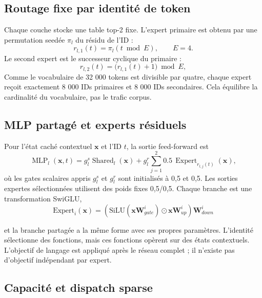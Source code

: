 \documentclass[10pt]{article}
\theoremstyle{definition}
\theoremstyle{remark}
\begin{document}
\subsection{Routage fixe par identit\'{e} de token}
\label{sec:token_routed_mlp}

Chaque couche stocke une table top-2 fixe. L'expert primaire est obtenu par une permutation seed\'{e}e $\pi_l$ du r\'{e}sidu de l'ID :
\begin{equation}
r_{l,1}(t)=\pi_l(t \bmod E), \qquad E=4.
\label{eq:routing}
\end{equation}
Le second expert est le successeur cyclique du primaire :
\begin{equation}
r_{l,2}(t)=\bigl(r_{l,1}(t)+1\bigr)\bmod E,
\label{eq:secondary_routing}
\end{equation}
Comme le vocabulaire de 32 000 tokens est divisible par quatre, chaque expert re\c{c}oit exactement 8 000 IDs primaires et 8 000 IDs secondaires. Cela \'{e}quilibre la cardinalit\'{e} du vocabulaire, pas le trafic corpus.

\subsection{MLP partag\'{e} et experts r\'{e}siduels}

Pour l'\'{e}tat cach\'{e} contextuel $\mathbf{x}$ et l'ID $t$, la sortie feed-forward est
\begin{equation}
\operatorname{MLP}_l(\mathbf{x},t)=g^s_l\operatorname{Shared}_l(\mathbf{x})+g^r_l\!\sum_{j=1}^{2}0.5\,\operatorname{Expert}_{r_{l,j}(t)}(\mathbf{x}),
\label{eq:mlp_routed}
\end{equation}
o\`{u} les gates scalaires appris $g^s_l$ et $g^r_l$ sont initialis\'{e}s \`{a} 0,5 et 0,5. Les sorties expertes s\'{e}lectionn\'{e}es utilisent des poids fixes 0,5/0,5. Chaque branche est une transformation SwiGLU,
\begin{equation}
\text{Expert}_i(\mathbf{x}) = (\text{SiLU}(\mathbf{x}\mathbf{W}^i_{gate}) \odot \mathbf{x}\mathbf{W}^i_{up})\mathbf{W}^i_{down}
\label{eq:expert}
\end{equation}

et la branche partag\'{e}e a la m\^{e}me forme avec ses propres param\`{e}tres. L'identit\'{e} s\'{e}lectionne des fonctions, mais ces fonctions op\`{e}rent sur des \'{e}tats contextuels. L'objectif de langage est appliqu\'{e} apr\`{e}s le r\'{e}seau complet ; il n'existe pas d'objectif ind\'{e}pendant par expert.

\subsection{Capacit\'{e} et dispatch sparse}
\end{document}
